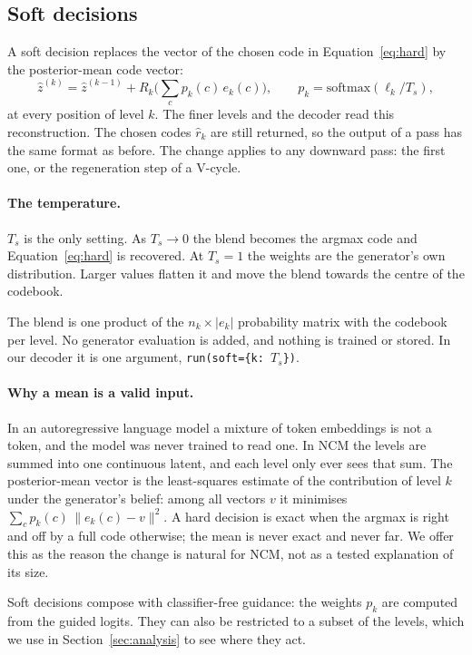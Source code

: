 \documentclass[11pt]{article}
\begin{document}
\subsection{Soft decisions}
\label{sec:method-down}

A soft decision replaces the vector of the chosen code in Equation~\ref{eq:hard} by the posterior-mean code vector:
\begin{equation}
\hat z^{(k)}=\hat z^{(k-1)}+R_k\Big(\sum_{c} p_k(c)\,e_k(c)\Big),\qquad p_k=\mathrm{softmax}(\ell_k/T_s),
\label{eq:soft}
\end{equation}
at every position of level $k$. The finer levels and the decoder read this reconstruction. The chosen codes
$\hat r_k$ are still returned, so the output of a pass has the same format as before. The change applies to any
downward pass: the first one, or the regeneration step of a V-cycle.

\paragraph{The temperature.} $T_s$ is the only setting. As $T_s\to0$ the blend becomes the argmax code and
Equation~\ref{eq:hard} is recovered. At $T_s=1$ the weights are the generator's own distribution. Larger values
flatten it and move the blend towards the centre of the codebook.

The blend is one product of the $n_k\times|e_k|$ probability matrix with the codebook per level. No
generator evaluation is added, and nothing is trained or stored. In our decoder it is one argument,
\texttt{run(soft=\{k:\,$T_s$\})}.

\paragraph{Why a mean is a valid input.} In an autoregressive language model a mixture of token embeddings is not a
token, and the model was never trained to read one. In NCM the levels are summed into one continuous latent, and each
level only ever sees that sum. The posterior-mean vector is the least-squares estimate of the contribution of level
$k$ under the generator's belief: among all vectors $v$ it minimises $\sum_c p_k(c)\,\lVert e_k(c)-v\rVert^2$. A hard
decision is exact when the argmax is right and off by a full code otherwise; the mean is never exact and never far.
We offer this as the reason the change is natural for NCM, not as a tested explanation of its size.

Soft decisions compose with classifier-free guidance: the weights $p_k$ are computed from
the guided logits. They can also be restricted to a subset of the levels, which we use in
Section~\ref{sec:analysis} to see where they act.
\end{document}
